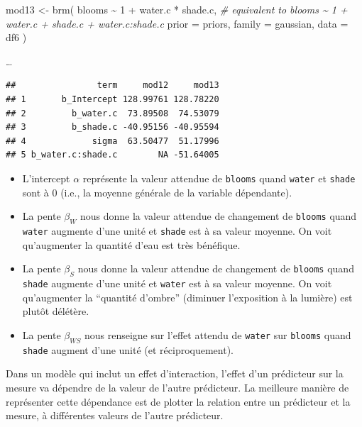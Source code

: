 \documentclass[
  a4paper,11pt,twoside,onecolumn,openright,final,oldfontcommands]{memoir}
\newenvironment{Shaded}{\begin{snugshade}}{\end{snugshade}}
\newcommand{\AttributeTok}[1]{\textcolor[rgb]{0.77,0.63,0.00}{#1}}
\newcommand{\CommentTok}[1]{\textcolor[rgb]{0.56,0.35,0.01}{\textit{#1}}}
\newcommand{\DecValTok}[1]{\textcolor[rgb]{0.00,0.00,0.81}{#1}}
\newcommand{\FunctionTok}[1]{\textcolor[rgb]{0.00,0.00,0.00}{#1}}
\newcommand{\NormalTok}[1]{#1}
\newcommand{\OtherTok}[1]{\textcolor[rgb]{0.56,0.35,0.01}{#1}}
\newcommand{\SpecialCharTok}[1]{\textcolor[rgb]{0.00,0.00,0.00}{#1}}
\theoremstyle{definition}
\theoremstyle{definition}
\theoremstyle{definition}
\theoremstyle{remark}
\begin{document}
\begin{Shaded}
\begin{Highlighting}[]
\NormalTok{mod13 }\OtherTok{\textless{}{-}} \FunctionTok{brm}\NormalTok{(}
\NormalTok{  blooms }\SpecialCharTok{\textasciitilde{}} \DecValTok{1} \SpecialCharTok{+}\NormalTok{ water.c }\SpecialCharTok{*}\NormalTok{ shade.c,}
  \CommentTok{\# equivalent to blooms \textasciitilde{} 1 + water.c + shade.c + water.c:shade.c}
  \AttributeTok{prior =}\NormalTok{ priors,}
  \AttributeTok{family =}\NormalTok{ gaussian,}
  \AttributeTok{data =}\NormalTok{ df6}
\NormalTok{  )}
\end{Highlighting}
\end{Shaded}

\ldots{}

\begin{verbatim}
##                term     mod12     mod13
## 1       b_Intercept 128.99761 128.78220
## 2         b_water.c  73.89508  74.53079
## 3         b_shade.c -40.95156 -40.95594
## 4             sigma  63.50477  51.17996
## 5 b_water.c:shade.c        NA -51.64005
\end{verbatim}

\begin{itemize}
\item
  L'intercept \(\alpha\) représente la valeur attendue de \texttt{blooms} quand \texttt{water} et \texttt{shade} sont à 0 (i.e., la moyenne générale de la variable dépendante).
\item
  La pente \(\beta_{W}\) nous donne la valeur attendue de changement de \texttt{blooms} quand \texttt{water} augmente d'une unité et \texttt{shade} est à sa valeur moyenne. On voit qu'augmenter la quantité d'eau est très bénéfique.
\item
  La pente \(\beta_{S}\) nous donne la valeur attendue de changement de \texttt{blooms} quand \texttt{shade} augmente d'une unité et \texttt{water} est à sa valeur moyenne. On voit qu'augmenter la ``quantité d'ombre'' (diminuer l'exposition à la lumière) est plutôt délétère.
\item
  La pente \(\beta_{WS}\) nous renseigne sur l'effet attendu de \texttt{water} sur \texttt{blooms} quand \texttt{shade} augment d'une unité (et réciproquement).
\end{itemize}

Dans un modèle qui inclut un effet d'interaction, l'effet d'un prédicteur sur la mesure va dépendre de la valeur de l'autre prédicteur. La meilleure manière de représenter cette dépendance est de plotter la relation entre un prédicteur et la mesure, à différentes valeurs de l'autre prédicteur.
\end{document}
